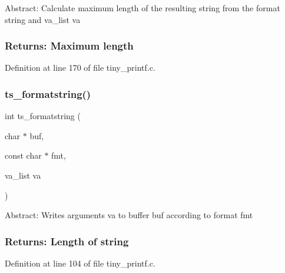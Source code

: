  Abstract\+: Calculate maximum length of the resulting string from the format string and va\+\_\+list va \subsubsection*{Returns\+: Maximum length }

Definition at line 170 of file tiny\+\_\+printf.\+c.

\mbox{\label{tiny__printf_8c_a2ad0dde0523459a3606aa5f7d7d8af6a}} 
\subsubsection{ts\+\_\+formatstring()}
{\footnotesize\ttfamily int ts\+\_\+formatstring (\begin{DoxyParamCaption}\item[{char $\ast$}]{buf,  }\item[{const char $\ast$}]{fmt,  }\item[{va\+\_\+list}]{va }\end{DoxyParamCaption})}



 Abstract\+: Writes arguments va to buffer buf according to format fmt \subsubsection*{Returns\+: Length of string }

Definition at line 104 of file tiny\+\_\+printf.\+c.

